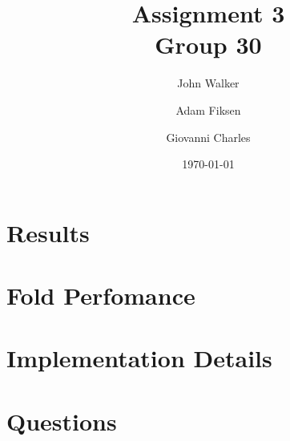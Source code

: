 \documentclass[11pt]{article}
\begin{document}
\title{Assignment 3 \\ Group 30  }

\author{John Walker \and Adam Fiksen \and Giovanni Charles }

\date{\today}         %

\maketitle           %


\section{Results}
\section{Fold Perfomance}
\section{Implementation Details}
\section{Questions}
\end{document}
